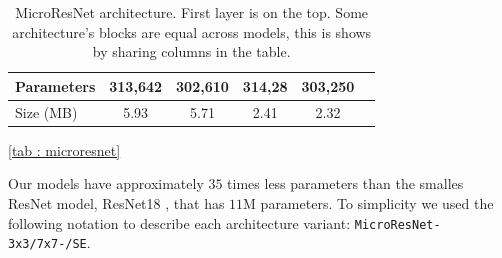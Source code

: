\documentclass[../document.tex]{subfiles}
\begin{document}
\begin{table}[htbp]
\begin{tabular}{@{}l|c|c|c|cc@{}}
               Parameters &  313,642 & 302,610  &  314,28 & 303,250 \\
            \hline
               Size (MB) & 5.93 & 5.71 &  2.41 & 2.32 \\ 
               \hline 
        \end{tabular}
        \caption{MicroResNet architecture. First layer is on the top. Some architecture's blocks are equal across models, this is shows by sharing columns in the table.}
        \ref{tab : microresnet}
    \end{table}
Our models have approximately $35$ times less parameters than the smalles ResNet model, ResNet18 \cite{he2015deep}, that has $11$M parameters. To simplicity we used the following notation to describe each architecture variant: \texttt{MicroResNet-{3x3/7x7}-{/SE}}.
\begin{figure}[htbp]
    \centering
    \begin{subfigure}[b]{0.22\textwidth}

\end{subfigure}
\end{figure}
\end{document}
